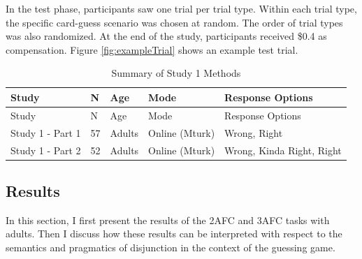 \documentclass[oneside]{report}
\theoremstyle{definition}
\theoremstyle{definition}
\theoremstyle{definition}
\theoremstyle{remark}
\begin{document}
In the test phase, participants saw one trial per trial type. Within
each trial type, the specific card-guess scenario was chosen at random.
The order of trial types was also randomized. At the end of the study,
participants received \$0.4 as compensation. Figure
\ref{fig:exampleTrial} shows an example test trial.
\begin{longtable}[]{@{}lllll@{}}
\caption{\label{tab:study1info} Summary of Study 1 Methods}\tabularnewline
\toprule
Study & N & Age & Mode & Response Options\tabularnewline
\midrule
\endfirsthead
\toprule
Study & N & Age & Mode & Response Options\tabularnewline
\midrule
\endhead
Study 1 - Part 1 & 57 & Adults & Online (Mturk) & Wrong,
Right\tabularnewline
Study 1 - Part 2 & 52 & Adults & Online (Mturk) & Wrong, Kinda Right,
Right\tabularnewline
\bottomrule
\end{longtable}
\subsection{Results}\label{results-2}

In this section, I first present the results of the 2AFC and 3AFC tasks
with adults. Then I discuss how these results can be interpreted with
respect to the semantics and pragmatics of disjunction in the context of
the guessing game.
\end{document}
